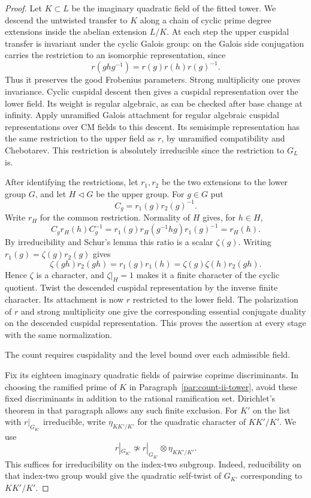 \begin{proof}

Let \(K\subset L\) be the imaginary quadratic field of the
fitted tower. We descend the untwisted transfer to \(K\)
along a chain of cyclic prime degree extensions inside the
abelian extension \(L/K\). At each step the upper cuspidal
transfer is invariant under the cyclic Galois group:
on the Galois side conjugation carries the restriction to an isomorphic representation, since
\[
 r(ghg^{-1})=r(g)r(h)r(g)^{-1}.
\]
Thus it preserves the good Frobenius parameters. Strong multiplicity one proves invariance.
Cyclic cuspidal descent then gives a cuspidal representation
over the lower field. Its weight is regular algebraic,
as can be checked after base change at infinity. Apply
unramified Galois attachment for regular algebraic cuspidal
representations over CM fields to this descent. Its
semisimple representation has the same restriction to
the upper field as \(r\), by unramified compatibility and
Chebotarev. This restriction is absolutely irreducible
since the restriction to \(G_L\) is.

After identifying the restrictions, let \(r_1,r_2\)
be the two extensions to the lower group \(G\), and let
\(H\triangleleft G\) be the upper group. For \(g\in G\) put
\[
 C_g=r_1(g)r_2(g)^{-1}.
\]
Write \(r_H\) for the common restriction. Normality of \(H\) gives, for \(h\in H\),
\[
 C_g r_H(h)C_g^{-1}=r_1(g)r_H(g^{-1}hg)r_1(g)^{-1}=r_H(h).
\]
By irreducibility and Schur's lemma this ratio is a
scalar \(\zeta(g)\). Writing \(r_1(g)=\zeta(g)r_2(g)\) gives
\[
 \zeta(gh)r_2(gh)=r_1(g)r_1(h)=\zeta(g)\zeta(h)r_2(gh).
\]
Hence \(\zeta\) is a character, and \(\zeta|_H=1\)
makes it a finite character of the cyclic quotient.
Twist the descended cuspidal representation by the inverse
finite character.
Its attachment is now \(r\) restricted to the lower field.
The polarization of \(r\) and strong multiplicity one give
the corresponding essential conjugate duality on the
descended cuspidal representation. This proves the assertion
at every stage with the same normalization.
\hfill\mbox{\cite{clozel-rajan,harris-lan-taylor-thorne}}\label{cor:ordinary-count-ii-point-output-5}


The count requires cuspidality and the level bound over each admissible field.


Fix its eighteen imaginary quadratic fields of pairwise coprime discriminants.
In choosing the ramified prime of \(K\) in
Paragraph~\ref{par:count-ii-tower}, avoid these fixed
discriminants in addition to the rational ramification set.
Dirichlet's theorem in that paragraph allows any such finite
exclusion. For \(K'\) on the list with \(r|_{G_{K'}}\) irreducible,
write \(\eta_{KK'/K'}\) for the quadratic character of
\(KK'/K'\). We use
\[
        r|_{G_{K'}}\not\simeq
               r|_{G_{K'}}\otimes\eta_{KK'/K'} .
\]
This suffices for irreducibility on the index-two subgroup. Indeed, reducibility on that index-two group
would give the quadratic self-twist of \(G_{K'}\)
corresponding to \(KK'/K'\).


\end{proof}
